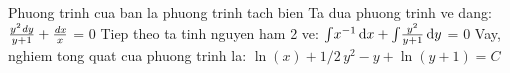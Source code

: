 \documentclass{article}
\begin{document}
Phuong trinh cua ban la phuong trinh tach bien \newline
 Ta dua phuong trinh ve dang:  \newline
 \({\frac {{y}^{2}{\it dy}}{y+1}}+{\frac {{\it dx}}{x}}\) = 0 \newline
 Tiep theo ta tinh nguyen ham 2 ve: \newline
 \(\int \!{x}^{-1}\,{\rm d}x+\int \!{\frac {{y}^{2}}{y+1}}\,{\rm d}y\) = 0   \newline
 Vay, nghiem tong quat cua phuong trinh la:  \newline
 \(\ln  \left( x \right) +1/2\,{y}^{2}-y+\ln  \left( y+1 \right) =C\)\newline
\end{document}
